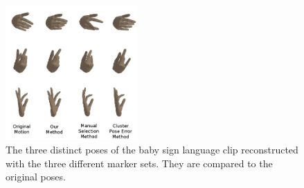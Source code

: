 \begin{figure}[ht]
  \centering
  \includegraphics[trim = 28mm 0mm 0mm 0mm,
width=0.45\textwidth]{images/compiled_babySigns1_poses.jpg} %
  \caption{The three distinct poses of the baby sign language clip
reconstructed with the three different marker sets. They are compared to
the original poses.}
  \label{fig:BabySigns_methods}
\end{figure}





